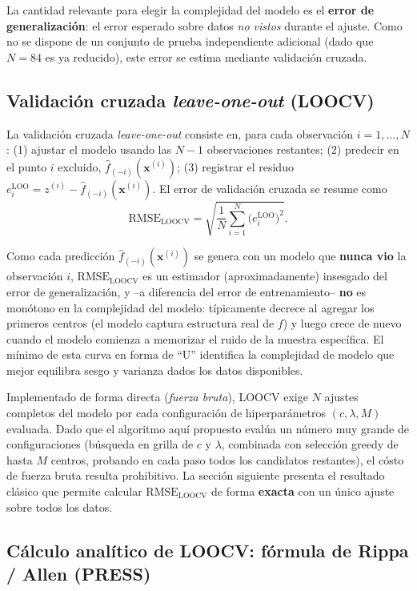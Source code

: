 \documentclass[11pt,a4paper]{article}
\begin{document}
La cantidad relevante para elegir la complejidad del modelo es el
\textbf{error de generalizaci\'on}: el error esperado sobre datos \emph{no
vistos} durante el ajuste. Como no se dispone de un conjunto de prueba
independiente adicional (dado que $N=84$ es ya reducido), este error se
estima mediante validaci\'on cruzada.

\subsection{Validaci\'on cruzada \emph{leave-one-out} (LOOCV)}
\label{subsec:loocv}

La validaci\'on cruzada \emph{leave-one-out} consiste en, para cada
observaci\'on $i=1,\dots,N$: (1) ajustar el modelo usando las $N-1$
observaciones restantes; (2) predecir en el punto $i$ excluido,
$\hat f_{(-i)}(\mathbf{x}^{(i)})$; (3) registrar el residuo
$e_i^{\text{LOO}} = z^{(i)} - \hat f_{(-i)}(\mathbf{x}^{(i)})$. El error de
validaci\'on cruzada se resume como
\[
\text{RMSE}_{\text{LOOCV}} = \sqrt{\frac{1}{N}\sum_{i=1}^{N} \big(
e_i^{\text{LOO}}\big)^2 } .
\]

Como cada predicci\'on $\hat f_{(-i)}(\mathbf{x}^{(i)})$ se genera con un
modelo que \textbf{nunca vio} la observaci\'on $i$, $\text{RMSE}_{\text{LOOCV}}$
es un estimador (aproximadamente) insesgado del error de generalizaci\'on, y
--a diferencia del error de entrenamiento-- \textbf{no} es mon\'otono en la
complejidad del modelo: t\'ipicamente decrece al agregar los primeros centros
(el modelo captura estructura real de $f$) y luego crece de nuevo cuando el
modelo comienza a memorizar el ruido de la muestra espec\'ifica. El m\'inimo
de esta curva en forma de ``U'' identifica la complejidad de modelo que mejor
equilibra sesgo y varianza dados los datos disponibles.

Implementado de forma directa (\emph{fuerza bruta}), LOOCV exige $N$ ajustes
completos del modelo por cada configuraci\'on de hiperpar\'ametros
$(c,\lambda,M)$ evaluada. Dado que el algoritmo aqu\'i propuesto eval\'ua un
n\'umero muy grande de configuraciones (b\'usqueda en grilla de $c$ y
$\lambda$, combinada con selecci\'on greedy de hasta $M$ centros, probando en
cada paso todos los candidatos restantes), el c\'osto de fuerza bruta resulta
prohibitivo. La secci\'on siguiente presenta el resultado cl\'asico que
permite calcular $\text{RMSE}_{\text{LOOCV}}$ de forma \textbf{exacta} con un
\'unico ajuste sobre todos los datos.

\subsection{C\'alculo anal\'itico de LOOCV: f\'ormula de Rippa / Allen (PRESS)}
\label{subsec:rippa}
\end{document}
